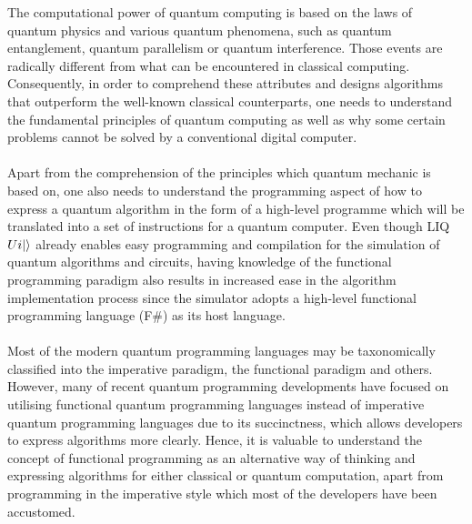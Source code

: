 \documentclass[12pt]{third-rep}
\begin{document}
\noindent The computational power of quantum computing is based on the laws of quantum physics and various quantum phenomena, such as quantum entanglement,  quantum parallelism or quantum interference. Those events are radically different from what can be encountered in classical computing. Consequently, in order to comprehend these attributes and designs algorithms that outperform the well-known classical counterparts, one needs to understand the fundamental principles of quantum computing as well as why some certain problems cannot be solved by a conventional digital computer. \\\\
Apart from the comprehension of the principles which quantum mechanic is based on, one also needs to understand the programming aspect of how to express a quantum algorithm in the form of a high-level programme which will be translated into a set of instructions for a quantum computer. Even though LIQ$Ui{\left\vert{}\right\rangle}$ already enables easy programming and compilation for the simulation of quantum algorithms and circuits, having knowledge of the functional programming paradigm also results in increased ease in the algorithm implementation process since the simulator adopts a high-level functional programming language (F\#) as its host language. \\\\
Most of the modern quantum programming languages may be taxonomically classified into the imperative paradigm, the functional paradigm and others. However, many of recent quantum programming developments have focused on utilising functional quantum programming languages instead of imperative quantum programming languages due to its succinctness, which allows developers to express algorithms more clearly. Hence, it is valuable to understand the concept of functional programming as an alternative way of thinking and expressing algorithms for either classical or quantum computation, apart from programming in the imperative style which most of the developers have been accustomed.

\nocite{1402.4467}

\appendix

\titleformat{\chapter}{\normalfont\huge\bf}{\chaptertitlename \ \thechapter\ \ \ --}{20pt}{\huge\bf} 
\end{document}
